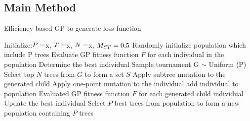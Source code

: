 \begin{ZhChapter}

    \section{Main Method}

    \begin{algorithm}
        \caption{Efficiency-based GP to generate loss function}\label{alg:cap}
        \begin{algorithmic}
            \State Initialize:$P = \space $x, $T =\space $x, $N = \space $x, $M_{ST} = \space0.5$
            \State Randomly initialize population which include P trees
            \State Evaluate GP fitness function $F$ for each individual in the population
            \State Determine the best individual
            \State Sample tournament G $\sim$ Uniform (P)
            \State Select top $N$ trees from $G$ to form a set $S$
            \State Apply subtree mutation to the generated child
            \Else
            \State Apply one-point mutation to the individual
            \EndIf
            \State add individual to population
            \EndIf
            \EndFor
            \State Evaluated GP fitness function $F$ for each generated child individual
            \State Update the best individual
            \State Select $P$ best trees from population to form a new population containing $P$ trees
            \EndWhile
        \end{algorithmic}
    \end{algorithm}


\end{ZhChapter}
